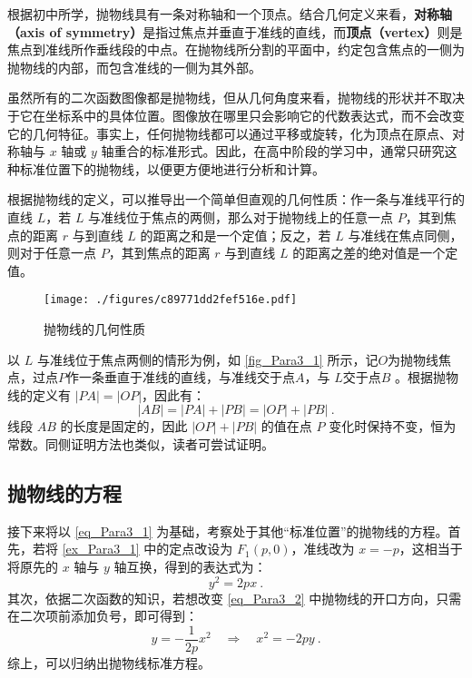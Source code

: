 根据初中所学，抛物线具有一条对称轴和一个顶点。结合几何定义来看，\textbf{对称轴（axis of symmetry）}是指过焦点并垂直于准线的直线，而\textbf{顶点（vertex）}则是焦点到准线所作垂线段的中点。在抛物线所分割的平面中，约定包含焦点的一侧为抛物线的内部，而包含准线的一侧为其外部。

虽然所有的二次函数图像都是抛物线，但从几何角度来看，抛物线的形状并不取决于它在坐标系中的具体位置。图像放在哪里只会影响它的代数表达式，而不会改变它的几何特征。事实上，任何抛物线都可以通过平移或旋转，化为顶点在原点、对称轴与 $x$ 轴或 $y$ 轴重合的标准形式。因此，在高中阶段的学习中，通常只研究这种标准位置下的抛物线，以便更方便地进行分析和计算。

根据抛物线的定义，可以推导出一个简单但直观的几何性质：作一条与准线平行的直线 $L$，若 $L$ 与准线位于焦点的两侧，那么对于抛物线上的任意一点 $P$，其到焦点的距离 $r$ 与到直线 $L$ 的距离之和是一个定值；反之，若 $L$ 与准线在焦点同侧，则对于任意一点 $P$，其到焦点的距离 $r$ 与到直线 $L$ 的距离之差的绝对值是一个定值。

\begin{figure}[ht]
\centering
\texttt{[image: ./figures/c89771dd2fef516e.pdf]}
\caption{抛物线的几何性质} \label{fig_Para3_1}
\end{figure}

以 $L$ 与准线位于焦点两侧的情形为例，如 \autoref{fig_Para3_1} 所示，记$O$为抛物线焦点，过点$P$作一条垂直于准线的直线，与准线交于点$A$，与 $L$交于点$B$ 。根据抛物线的定义有 $|PA| = |OP|$，因此有：
\begin{equation}
|AB|=|PA| +|PB| =|OP| +|PB|~.
\end{equation}
线段 $AB$ 的长度是固定的，因此 $|OP| +|PB|$ 的值在点 $P$ 变化时保持不变，恒为常数。同侧证明方法也类似，读者可尝试证明。

\subsection{抛物线的方程}

接下来将以 \autoref{eq_Para3_1} 为基础，考察处于其他“标准位置”的抛物线的方程。首先，若将 \autoref{ex_Para3_1} 中的定点改设为 $F_1(p,0)$，准线改为 $x = -p$，这相当于将原先的 $x$ 轴与 $y$ 轴互换，得到的表达式为：
\begin{equation}\label{eq_Para3_5}
y^2 = 2px~.
\end{equation}
其次，依据二次函数的知识，若想改变 \autoref{eq_Para3_2} 中抛物线的开口方向，只需在二次项前添加负号，即可得到：
\begin{equation}
y = -\frac{1}{2p}x^2 \quad \Longrightarrow \quad x^2 = -2py~.
\end{equation}
综上，可以归纳出抛物线标准方程。

